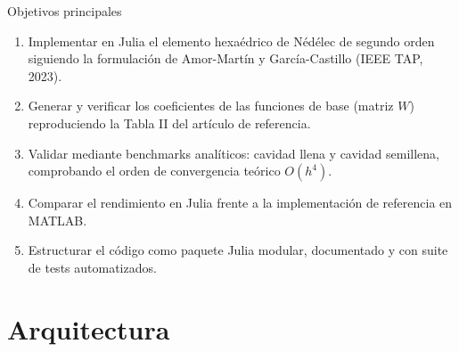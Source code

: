 \documentclass[aspectratio=169,11pt]{beamer}
\begin{document}
\begin{frame}{Objetivos principales}
  \begin{enumerate}
    \item Implementar en Julia el elemento hexaédrico de Nédélec de segundo
          orden siguiendo la formulación de Amor-Martín y García-Castillo
          (IEEE TAP, 2023).
    \item Generar y verificar los coeficientes de las funciones de base
          (matriz $W$) reproduciendo la Tabla II del artículo de referencia.
    \item Validar mediante benchmarks analíticos: cavidad llena y cavidad
          semillena, comprobando el orden de convergencia teórico $O(h^4)$.
    \item Comparar el rendimiento en Julia frente a la implementación de
          referencia en MATLAB.
    \item Estructurar el código como paquete Julia modular, documentado y con
          suite de tests automatizados.
  \end{enumerate}
\end{frame}

\section{Arquitectura}
\end{document}
